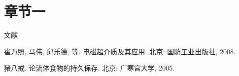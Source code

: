 
\section{章节一}
文献\cite{Meta_CN,zhubajie}

\begin{thebibliography}{99}
崔万照, 马伟, 邱乐德, 等.
\newblock 电磁超介质及其应用\allowbreak[M].
\newblock 北京: 国防工业出版社, 2008.

猪八戒.
\newblock 论流体食物的持久保存\allowbreak[Z].
\newblock 北京: 广寒宫大学, 2005.
\end{thebibliography}

